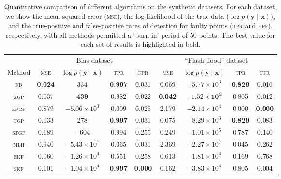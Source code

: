\documentclass[letterpaper]{article}
\newcommand{\given}{\!\ensuremath{\mid}\!}
\newcommand{\bm}[1]{\ensuremath{\mathbf{#1}}}
\begin{document}
\begin{table}[t]
  \centering
  \caption{Quantitative comparison of different algorithms on the
    synthetic datasets.  For each dataset, we show the mean squared error
    (\textsc{mse}), the log likelihood of the true data ($\log p(\bm{y}
    \given \bm{x})$), and the true-positive and false-positive rates
    of detection for faulty points (\textsc{tpr} and \textsc{fpr}),
    respectively, with all methods permitted a `burn-in' period of 50 points. The best value for each set of results is highlighted in
    bold.}\vspace{0.3cm}
  \label{tbl:results}
  \begin{tabular}{ccccccccc}
    \toprule
& \multicolumn{4}{c}{Bias dataset} & \multicolumn{4}{c}{``Flash-flood'' dataset}\\
    \cmidrule(l){2-5} \cmidrule(l){6-9}
    Method & \scshape{mse} & $\log p(\bm{y}\given\bm{x})$ & \scshape{tpr} & \scshape{fpr} 
& \scshape{mse} & $\log p(\bm{y}\given\bm{x})$ & \scshape{tpr} & \scshape{fpr} \\
\midrule
    \scshape{fb} & \textbf{0.024} & 334 & \textbf{0.997} & 0.031 & 0.069 & $-5.77\times 10^3$ & \textbf{0.829} & {0.016} \\
    \scshape{xgp} & 0.037 & \textbf{439} & 0.982 & {0.022} & \textbf{0.042} & $\mathbf{-1.52 \times 10^3}$ & 0.805 & 0.012 \\
\scshape{epgp} & 0.879 & $-5.06 \times 10^3$ & 0.009 & 0.025 
	       & 2.179 & $-2.14 \times 10^4$ & 0.000 & \textbf{0.000} \\ 
    \scshape{tgp} & 0.033 & 278 & \textbf{0.997} & 0.031 & 0.075 & $-8.29\times 10^3$ & \textbf{0.829} & 0.083 \\
   \scshape{stgp} & 0.189 & $-604$ & 0.994 & 0.255 &
		  0.249 & $-1.01\times 10^5$ & 0.787 & 0.140\\
    \scshape{mlh} & 0.940 & $-5.43\times 10^7$ & 0.065 & 0.031 & 2.369 & $-2.27\times 10^7$ & 0.045 & 0.262 \\
   \scshape{ekf} & 0.060 & $-1.26 \times 10^4$ & 0.551 & 0.258 & 0.613 & $-1.81\times 10^4$ & 0.169 & 0.768 \\
   \scshape{skf} & 0.101 & $-1.04 \times 10^4$ & \textbf{0.997} & \textbf{0.000} & 0.162 & $-3.83\times 10^4$ & 0.805 & 0.004 \\
    \bottomrule
  \end{tabular}
\end{table}
\end{document}

